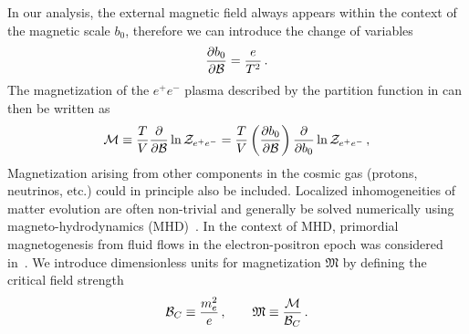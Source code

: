 In our analysis, the external magnetic field always appears within the context of the magnetic scale $b_{0}$, therefore we can introduce the change of variables
\begin{align}
 \frac{\partial b_{0}}{\partial{\cal B}}=\frac{e}{T^{2}}\,.
\end{align}
The magnetization of the $e^{+}e^{-}$ plasma described by the partition function in  can then be written as
\begin{align}
 \label{defmagetization}
 {\cal M}\equiv\frac{T}{V}\frac{\partial}{\partial{\cal B}}\ln{{\cal Z}_{e^{+}e^{-}}} = \frac{T}{V}\left(\frac{\partial b_{0}}{\partial{\cal B}}\right)\frac{\partial}{\partial b_{0}}\ln{{\cal Z}_{e^{+}e^{-}}}\,,
\end{align}
Magnetization arising from other components in the cosmic gas (protons, neutrinos, etc.) could in principle also be included. Localized inhomogeneities of matter evolution are often non-trivial and generally be solved numerically using magneto-hydrodynamics (MHD)~\cite{melrose2008quantum,Vazza:2017qge,Vachaspati:2020blt}. In the context of MHD, primordial magnetogenesis from fluid flows in the electron-positron epoch was considered in~\cite{Gopal:2004ut,Perrone:2021srr}. We introduce dimensionless units for magnetization ${\mathfrak M}$ by defining the critical field strength
\begin{align}
 {\cal B}_{C}\equiv\frac{m_{e}^{2}}{e}\,,\qquad{\mathfrak M}\equiv\frac{\cal M}{{\cal B}_{C}}\,.
\end{align}

